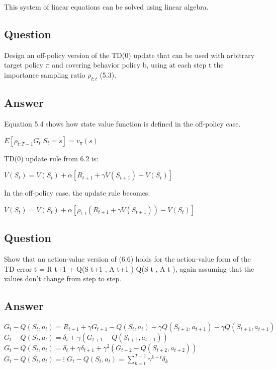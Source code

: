 \documentclass[11pt]{article}
\begin{document}
    This system of linear equations can be solved using linear algebra.

    \subsection{Question}

    Design an off-policy version of the TD(0) update that can be used with arbitrary target policy $\pi$ and covering behavior policy b, using at each step t the importance sampling ratio $\rho_{t:t}$  (5.3).

    \subsection*{Answer}

    Equation 5.4 shows how state value function is defined in the off-policy case.

    $ E[  \rho_{t:T-1} G_{t} | S_t=s ] = v_{\pi}(s) $
    \newline

    TD(0) update rule from 6.2 is:

    $V(S_t) = V(S_t) + \alpha [ R_{t+1} + \gamma V(S_{t+1}) -V(S_t) ]  $
    \newline

    In the off-policy case, the update rule becomes:

    $V(S_t) = V(S_t) + \alpha [ \rho_{t:t} ( R_{t+1} + \gamma V(S_{t+1}) ) -V(S_t) ]  $

    \subsection{Question}
    Show that an action-value version of (6.6) holds for the action-value form of the TD error t = R t+1 + Q(S t+1 , A t+1 ) Q(S t , A t ), again assuming that the values don’t change from step to step.

    \subsection*{Answer}

    $ G_t-Q(S_t,a_t) = R_{t+1} + \gamma G_{t+1} - Q(S_t,a_t) + \gamma Q(S_{t+1},a_{t+1}) - \gamma Q(S_{t+1},a_{t+1}) $
    \newline
    $ G_t-Q(S_t,a_t) = \delta_t + \gamma (G_{t+1} - Q(S_{t+1},a_{t+1}) ) $
    \newline
    $ G_t-Q(S_t,a_t) = \delta_t + \gamma \delta_{t+1} + \gamma^2 (G_{t+2} - Q(S_{t+2},a_{t+2}) )  $
    \newline
    $ G_t-Q(S_t,a_t) = \vdots$
    \newline
    $ G_t-Q(S_t,a_t) =  \sum_{k=t}^{T-1} \gamma^{k-t} \delta_k  $
\end{document}
